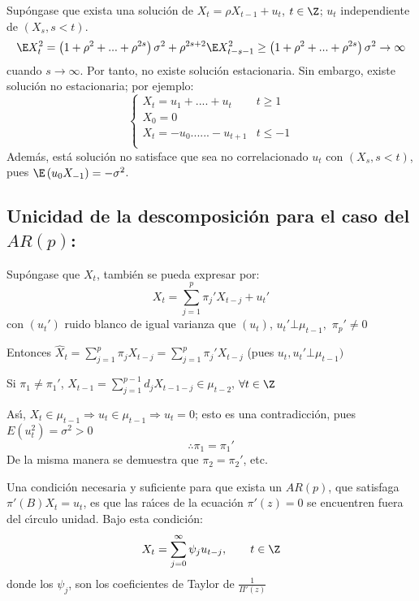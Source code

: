 \begin{itemize}
	Sup\'{o}ngase que exista una soluci\'{o}n de $X_{t} =\rho X_{t-1} +u_{t} $, $t\in \Z$; $u_{t} $ independiente de $\left( {X_{s} ,s<t} \right)$.
	\[
	 \E X_{t}^{2} =\left( {1+\rho^{2}+...+\rho^{2s}} \right)\sigma^{2}+\rho ^{2s+2}\E X_{t-s-1}^{2} \ge \left( {1+\rho^{2}+...+\rho^{2s}} \right)\sigma^{2}\to \infty
	\]
	cuando $s\to \infty $. Por tanto, no existe soluci\'{o}n estacionaria. Sin embargo, existe soluci\'{o}n no estacionaria; por ejemplo:
	\[
		\begin{cases}
			 X_{t} =u_{1} +....+u_{t} & t\ge 1 \\ 
			 X_{0} =0 \\ 
			 X_{t} =-u_{0} ......-u_{t+1} & t\le -1 \\ 
		\end{cases}
	\]
	Adem\'{a}s, est\'{a} soluci\'{o}n no satisface que sea no correlacionado $u_{t} $ con $(X_{s} ,s<t)$, pues $\E\left( {u_{0} X_{-1} } \right)=-\sigma^{2}$.
\end{itemize}

\subsection{Unicidad de la descomposici\'{o}n para el caso del $AR(p)$:}

Sup\'{o}ngase que $X_{t}$, tambi\'{e}n se pueda expresar por:
\[
X_{t} =\sum_{j=1}^p {\pi_{j}' X_{t-j} +u_{t}' } 
\]
con $(u_{t}' )$ ruido blanco de igual varianza que $(u_{t} )$, $u_{t}' 
\bot \mu_{t-1},$ $\pi_{p}' \ne 0$ 

Entonces $\widehat{{X}}_{t} =\sum_{j=1}^p {\pi_{j} X_{t-j} } 
=\sum_{j=1}^p {\pi_{j}' X_{t-j} } $ (pues $u_{t} ,u_{t}' \bot 
\mu_{t-1} )$

Si $\pi_{1} \ne \pi_{1}'$, $X_{t-1} =\sum_{j=1}^{p-1} {d_{j} 
X_{t-1-j} \in \mu_{t-2} }$, $\forall t\in \Z$

As\'{\i}, $X_{t} \in \mu_{t-1} \Rightarrow u_{t} \in \mu_{t-1} \Rightarrow 
u_{t} =0$; esto es una contradicci\'{o}n, pues $E\left( {u_{t}^{2} } 
\right)=\sigma^{2}>0$ 
\[
\therefore\pi_{1} =\pi_{1}' 
\]
De la misma manera se demuestra que $\pi_{2} =\pi_{2}'$, etc.

\begin{teorema}
 Una condici\'{o}n necesaria y suficiente para 
que exista un $AR(p)$, que satisfaga $\pi'( B)X_{t} =u_{t} $, 
es que las ra\'{\i}ces de la ecuaci\'{o}n $\pi'( z )=0$ se 
encuentren fuera del c\'{\i}rculo unidad. Bajo esta condici\'{o}n:
\[
X_{t} =\sum_{j=0}^\infty {\psi_{j} u_{t-j} } ,
\qquad
t\in \Z
\]
donde los $\psi_{j} $, son los coeficientes de Taylor de $\frac{1}{\Pi 
'\left( z \right)}$
\end{teorema}

